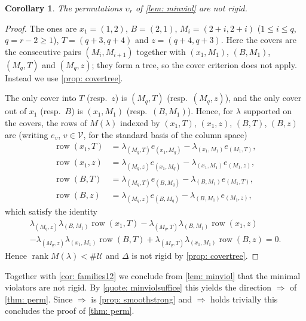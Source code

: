 \documentclass[12pt]{article}
\newtheorem{corollary}[theorem]{Corollary}
\newcommand{\U}{\mathcal{U}}
\newcommand{\V}{\mathcal{V}}
\newcommand{\rk}{\operatorname{rank}}
\newcommand{\IM}{\Delta}
\begin{document}
\begin{corollary}
The permutations $\upsilon_r$ of \cref{lem: minviol} are not rigid.
\end{corollary}

\begin{proof}
The ones are $x_1=(1,2)$, $B=(2,1)$, $M_i=(2+i,2+i)$ ($1\le i\le q$, $q=r-2\ge1$), $T=(q+3,q+4)$
and $z=(q+4,q+3)$. Here the covers are the consecutive pairs $(M_i,M_{i+1})$ together with $(x_1,M_1)$, $(B,M_1)$,
$(M_q,T)$ and $(M_q,z)$; they form a tree, so the cover criterion does not apply. Instead we use \cref{prop: covertree}.

The only cover into $T$ (resp.\ $z$) is $(M_q,T)$ (resp.\ $(M_q,z)$), and the only cover out of $x_1$ (resp.\ $B$) is $(x_1,M_1)$
(resp.\ $(B,M_1)$). Hence, for $\lambda$ supported on the covers, the rows of $M(\lambda)$
indexed by $(x_1,T)$, $(x_1,z)$, $(B,T)$, $(B,z)$ are (writing $e_v$, $v\in\V$, for the standard
basis of the column space)
\begin{align*}
\operatorname{row}(x_1,T)&=\lambda_{(M_q,T)}e_{(x_1,M_q)}-\lambda_{(x_1,M_1)}e_{(M_1,T)},\\
\operatorname{row}(x_1,z)&=\lambda_{(M_q,z)}e_{(x_1,M_q)}-\lambda_{(x_1,M_1)}e_{(M_1,z)},\\
\operatorname{row}(B,T)&=\lambda_{(M_q,T)}e_{(B,M_q)}-\lambda_{(B,M_1)}e_{(M_1,T)},\\
\operatorname{row}(B,z)&=\lambda_{(M_q,z)}e_{(B,M_q)}-\lambda_{(B,M_1)}e_{(M_1,z)},
\end{align*}
which satisfy the identity
\begin{multline*}
\lambda_{(M_q,z)}\lambda_{(B,M_1)}\operatorname{row}(x_1,T)
-\lambda_{(M_q,T)}\lambda_{(B,M_1)}\operatorname{row}(x_1,z)\\
-\lambda_{(M_q,z)}\lambda_{(x_1,M_1)}\operatorname{row}(B,T)
+\lambda_{(M_q,T)}\lambda_{(x_1,M_1)}\operatorname{row}(B,z)=0.
\end{multline*}
Hence $\rk M(\lambda)<\#\U$ and $\IM$ is not rigid by \cref{prop: covertree}.
\end{proof}

Together with \cref{cor: families12} we conclude from \cref{lem: minviol} that the minimal violators are not rigid.
By \cref{quote: minviolsuffice} this yields the direction $\Rightarrow$ of \cref{thm: perm}.
Since $\Rightarrow$ is \cref{prop: smoothstrong} and $\Rightarrow$ holds trivially this concludes the proof of \cref{thm: perm}.
\end{document}

